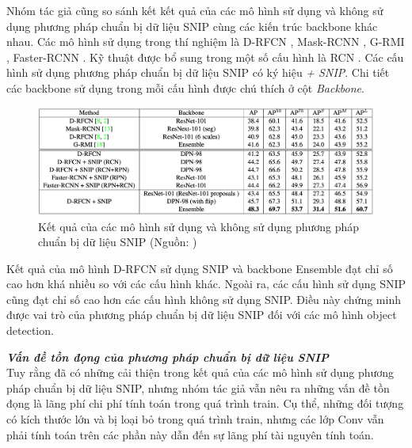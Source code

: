 {    \noindent
    Nhóm tác giả cũng so sánh kết kết quả của các mô hình sử dụng và không sử dụng phương pháp chuẩn bị dữ liệu SNIP cùng các kiến trúc backbone khác nhau.
    Các mô hình sử dụng trong thí nghiệm là D-RFCN \cite{}, Mask-RCNN \cite{}, G-RMI \cite{}, Faster-RCNN \cite{}.
    Kỹ thuật được bổ sung trong một số cấu hình là RCN \cite{}.
    Các cấu hình sử dụng phương pháp chuẩn bị dữ liệu SNIP có ký hiệu \textit{+ SNIP}.
    Chi tiết các backbone sử dụng trong mỗi cấu hình được chú thích ở cột \textit{Backbone}.
    
    \begin{figure}[H]
        \centering
        \includegraphics[width=16cm] {images/snip_results_2}
        \caption{Kết quả của các mô hình sử dụng và không sử dụng phương pháp chuẩn bị dữ liệu SNIP (Nguồn: \cite{singh2018analysis})}
        \label{fig:snip_results_2}
    \end{figure}

    \noindent
    Kết quả của mô hình D-RFCN sử dụng SNIP và backbone Ensemble đạt chỉ số cao hơn khá nhiều so với các cấu hình khác.
    Ngoài ra, các cấu hình sử dụng SNIP cũng đạt chỉ số cao hơn các cấu hình không sử dụng SNIP.
    Điều này chứng minh được vai trò của phương pháp chuẩn bị dữ liệu SNIP đối với các mô hình object detection.

    \noindent
    \textbf{\textit{Vấn đề tồn đọng của phương pháp chuẩn bị dữ liệu SNIP}} \\
    Tuy rằng đã có những cải thiện trong kết quả của các mô hình sử dụng phương pháp chuẩn bị dữ liệu SNIP, nhưng nhóm tác giả vẫn nêu ra những vấn đề tồn đọng là lãng phí chi phí tính toán trong quá trình train.
    Cụ thể, những đối tượng có kích thước lớn và bị loại bỏ trong quá trình train, nhưng các lớp Conv vẫn phải tính toán trên các phần này dẫn đến sự lãng phí tài nguyên tính toán.
}